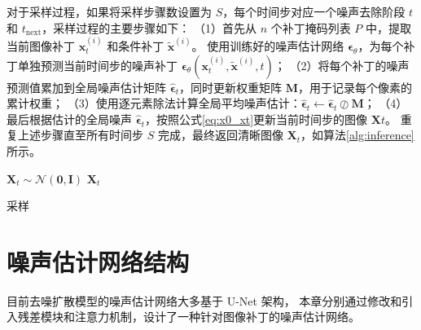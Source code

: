 对于采样过程，如果将采样步骤数设置为 $S$，每个时间步对应一个噪声去除阶段 $t$ 和 $t_{\text{next}}$，采样过程的主要步骤如下：
（1）首先从 $n$ 个补丁掩码列表 $P$ 中，提取当前图像补丁 $\mathbf{x}_t^{(i)}$ 和条件补丁 $\tilde{\mathbf{x}}^{(i)}$。
使用训练好的噪声估计网络 $\bm{\epsilon}_\theta$，为每个补丁单独预测当前时间步的噪声补丁 $\bm{\epsilon}_\theta\left(\mathbf{x}_t^{(i)}, \tilde{\mathbf{x}}^{(i)}, t\right)$；
（2）将每个补丁的噪声预测值累加到全局噪声估计矩阵 $\bm{\hat{\epsilon}}_t$，同时更新权重矩阵 $\mathbf{M}$，用于记录每个像素的累计权重；
（3）使用逐元素除法计算全局平均噪声估计：$\bm{\hat{\epsilon}}_t \leftarrow \bm{\hat{\epsilon}}_t \oslash \mathbf{M}$；
（4）最后根据估计的全局噪声 $\bm{\hat{\epsilon}}_t$，按照公式\eqref{eq:x0_xt}更新当前时间步的图像 $\bm{X}t$。
重复上述步骤直至所有时间步 $S$ 完成，最终返回清晰图像 $\bm{X}_t$，如算法\ref{alg:inference}所示。
\begin{algorithm}[ht]
    \SetAlgoLined
  
    $\bm{X}_{t} \sim \mathcal{N}(\mathbf{0}, \mathbf{I})$\;
    \Return $\bm{X}_t$\;
    \caption{采样}
    \label{alg:inference}
  \end{algorithm}

\section{噪声估计网络结构}
目前去噪扩散模型的噪声估计网络大多基于 U-Net \cite{unet}架构，
本章分别通过修改和引入残差模块和注意力机制，设计了一种针对图像补丁的噪声估计网络。

